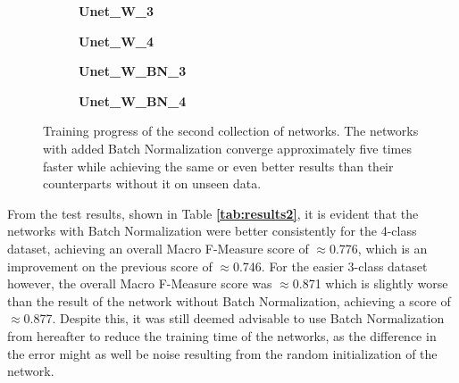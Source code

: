 \begin {figure}[!htb]
	\begin {subfigure}[b]{0.4\linewidth}
		\scalebox{0.65}{}
		\caption{\textbf{Unet\_W\_3}}
	\end {subfigure}\hspace{1.75cm}
	\begin {subfigure}[b]{0.4\linewidth}
		\scalebox{0.65}{}
		\caption{\textbf{Unet\_W\_4}}
	\end {subfigure}

	\begin {subfigure}[b]{0.4\linewidth}
		\scalebox{0.65}{}
		\caption{\textbf{Unet\_W\_BN\_3}}
	\end {subfigure}\hspace{1.75cm}
	\begin {subfigure}[b]{0.4\linewidth}
		\scalebox{0.65}{}
		\caption{\textbf{Unet\_W\_BN\_4}}
	\end {subfigure}

		\caption[Training progress of the second collection of networks.]{Training progress of the second collection of networks. The networks with added Batch Normalization converge approximately five times faster while achieving the same or even better results than their counterparts without it on unseen data.}
		\label{fig:weighted_weighted_batchnorm_training}
\end {figure}

\noindent From the test results, shown in Table \textbf{\ref{tab:results2}}, it is evident that the networks with Batch Normalization were better consistently for the 4-class dataset, achieving an overall Macro F-Measure score of $\approx$0.776, which is an improvement on the previous score of $\approx$0.746. For the easier 3-class dataset however, the overall Macro F-Measure score was $\approx$0.871 which is slightly worse than the result of the network without Batch Normalization, achieving a score of $\approx$0.877. Despite this, it was still deemed advisable to use Batch Normalization from hereafter to reduce the training time of the networks, as the difference in the error might as well be noise resulting from the random initialization of the network.\\

